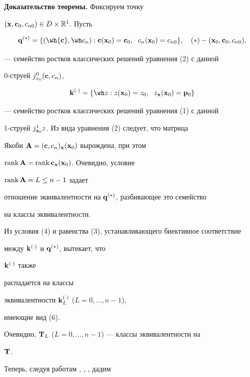 {\bf Доказательство теоремы.} Фиксируем точку


$(\bold x,\bold c_0,c_{n0})\in D\times\Bbb R^1$. Пусть


$$


\bold q^{(*)}=\{(\wh{\bold c},\wh c_n):\bold c(\bold x_0)=


\bold c_0, \ \;c_n(\bold x_0)=c_{n0}\},\quad


(*)-(\bold x_0,\bold c_0,c_{n0}),


$$


--- семейство ростков классических решений уравнения (2) с данной


0-струей $j^0_{x_0}(\bold c,c_n)$,


$$


\bold k^{(\cdot)}=\{\wh z:z(\bold x_0)=z_0,\ \;


z_{\bold x}(\bold x_0)=\bold p_0\}


$$


--- семейство ростков классических решений уравнения (1) с данной


1-струей $j^1_{\bold x_0}z$. Из вида уравнения (2) следует, что матрица


Якоби $\bold A=(\bold c,c_n)_{\bold x}(\bold x_0)$ вырождена, при этом


$\operatorname{rank}\bold A=\operatorname{rank}\bold c_{\bold x}(\bold x_0)$. Очевидно, условие


$\operatorname{rank}\bold A=L\le n-1$ задает


отношение эквивалентности на $\bold q^{(*)}$, разбивающее это семейство


на классы эквивалентности.





Из условия (4) и равенства (3), устанавливающего биективное соответствие


между $\bold k^{(\cdot)}$ и $\bold q^{(*)}$, вытекает, что


$\bold k^{(\cdot)}$ также


распадается на классы


эквивалентности $\bold k^{(\cdot)}_L$ ($L=0,\dotsc,n-1$),


имеющие вид (6).


Очевидно, $\bold T_L$ ($L=0,\dotsc,n-1$) --- классы эквивалентности на


$\bold T$.





Теперь, следуя работам \cite{R1}, \cite{G2}, \cite{I5}, дадим


